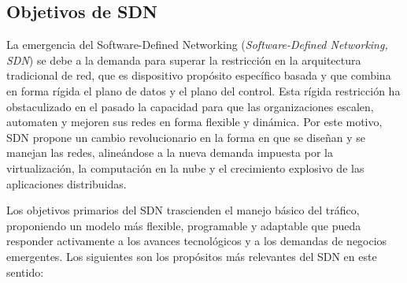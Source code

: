{        \subsection{Objetivos de SDN}
            La emergencia del Software-Defined Networking (\textit{Software-Defined Networking, SDN}) se debe a la demanda para superar la restricción en la arquitectura tradicional de red, que es dispositivo propósito específico basada y que combina en forma rígida el plano de datos y el plano del control. Esta rígida restricción ha obstaculizado en el pasado la capacidad para que las organizaciones escalen, automaten y mejoren sus redes en forma flexible y dinámica. Por este motivo, SDN propone un cambio revolucionario en la forma en que se diseñan y se manejan las redes, alineándose a la nueva demanda impuesta por la virtualización, la computación en la nube y el crecimiento explosivo de las aplicaciones distribuidas.

            Los objetivos primarios del SDN trascienden el manejo básico del tráfico, proponiendo un modelo más flexible, programable y adaptable que pueda responder activamente a los avances tecnológicos y a los demandas de negocios emergentes. Los siguientes son los propósitos más relevantes del SDN en este sentido:

}
